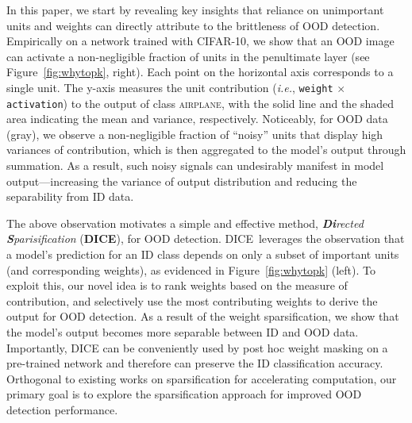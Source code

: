 \documentclass[runningheads]{llncs}
\newcommand{\methodAbbr}{DICE~}
\begin{document}
In this paper, we start by revealing key insights that reliance on unimportant units and weights can directly attribute to the brittleness of OOD detection. Empirically on a network trained with CIFAR-10, we show that an OOD image can activate a non-negligible fraction of units in the penultimate layer (see Figure~\ref{fig:whytopk}, right). Each point on the horizontal axis corresponds to a single unit. The y-axis measures the unit contribution (\emph{i.e.}, \texttt{weight} $\times$ \texttt{activation}) to the output of class \textsc{airplane}, with the solid line and the shaded area indicating the mean and variance, respectively. 
Noticeably, for OOD data (gray), we observe a non-negligible fraction of ``noisy'' units that display high variances of contribution, which is then aggregated to the model's output through summation. As a result, such noisy signals can undesirably manifest in model output---increasing the variance of output distribution and reducing the separability from ID data.

The above observation motivates a simple and effective method,
\emph{\textbf{Di}rected \textbf{S}parisification} (\textbf{DICE}), for OOD detection. \methodAbbr leverages the observation that a model's prediction for an ID class depends
on only a subset of important units (and corresponding weights), as evidenced in Figure~\ref{fig:whytopk} (left). To exploit this, our novel idea is to rank weights based on the measure of {contribution}, and selectively use the most contributing weights to derive the output for OOD detection. As a result of the weight sparsification, we show that the model's output becomes more separable between ID and OOD data.   Importantly, DICE can be conveniently used by {{post hoc} weight masking} on a pre-trained network and therefore can preserve the ID classification accuracy. 
Orthogonal to existing works on sparsification for accelerating computation, our primary goal is to explore the sparsification approach for improved  OOD detection performance.
\end{document}
